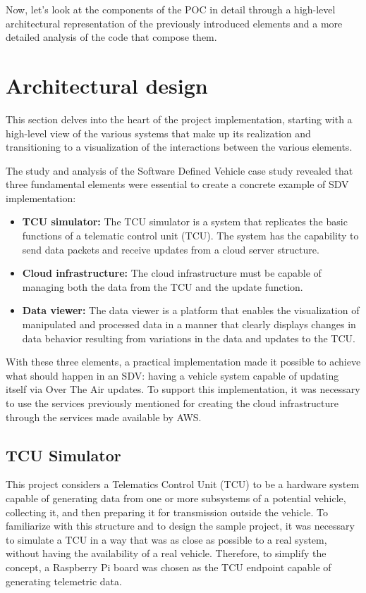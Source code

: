 Now, let's look at the components of the POC in detail through a high-level architectural representation of the previously introduced elements and a more detailed analysis of the code that compose them.

\section{Architectural design}
This section delves into the heart of the project implementation, starting with a high-level view of the various systems that make up its realization and transitioning to a visualization of the interactions between the various elements.

The study and analysis of the Software Defined Vehicle case study revealed that three fundamental elements were essential to create a concrete example of SDV implementation:
\begin{itemize}
    \item \textbf{TCU simulator:} The TCU simulator is a system that replicates the basic functions of a telematic control unit (TCU). The system has the capability to send data packets and receive updates from a cloud server structure.
    \item \textbf{Cloud infrastructure:} The cloud infrastructure must be capable of managing both the data from the TCU and the update function.
    \item \textbf{Data viewer:}  The data viewer is a platform that enables the visualization of manipulated and processed data in a manner that clearly displays changes in data behavior resulting from variations in the data and updates to the TCU.
\end{itemize}

With these three elements, a practical implementation made it possible to achieve what should happen in an SDV: having a vehicle system capable of updating itself via Over The Air updates. To support this implementation, it was necessary to use the services previously mentioned for creating the cloud infrastructure through the services made available by AWS.

\subsection{TCU Simulator}
This project considers a Telematics Control Unit (TCU) to be a hardware system capable of generating data from one or more subsystems of a potential vehicle, collecting it, and then preparing it for transmission outside the vehicle. To familiarize with this structure and to design the sample project, it was necessary to simulate a TCU in a way that was as close as possible to a real system, without having the availability of a real vehicle. Therefore, to simplify the concept, a Raspberry Pi board was chosen as the TCU endpoint capable of generating telemetric data.

